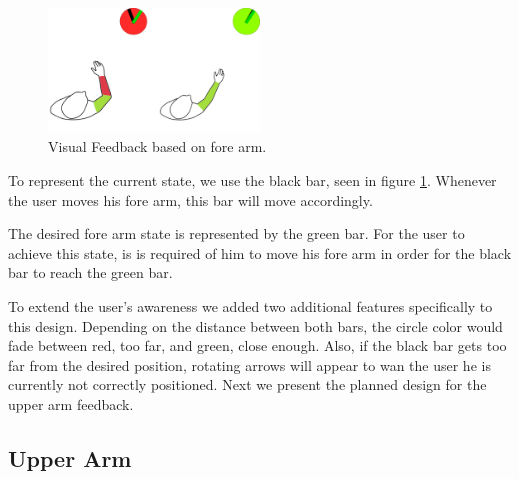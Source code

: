 
\begin{figure}[!t]
    \begin{center}
        \includegraphics[width=0.5\textwidth]{imgs/forearmfeedback.png}
    \end{center}
    \caption{Visual Feedback based on fore arm.}
    \label{fig:forearmfeedback}
\end{figure}

To represent the current state, we use the black bar, seen in figure \ref{fig:forearmfeedback}. Whenever the user moves his fore arm, this bar will move accordingly.


The desired fore arm state is represented by the green bar. For the user to achieve this state, is is required of him to move his fore arm in order for the black bar to reach the green bar.


To extend the user's awareness we added two additional features specifically to this design. Depending on the distance between both bars, the circle color would fade between red, too far, and green, close enough. Also, if the black bar gets too far from the desired position, rotating arrows will appear to wan the user he is currently not correctly positioned. Next we present the planned design for the upper arm feedback.


\subsection{Upper Arm}

